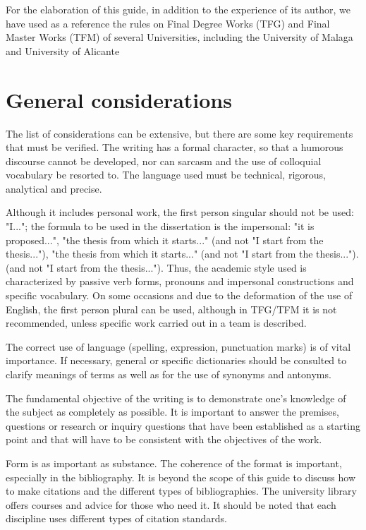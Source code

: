 For the elaboration of this guide, in addition to the experience of its author, we have used as a reference the rules on Final Degree Works (TFG) and Final Master Works (TFM) of several Universities, including the University of Malaga \cite{malaga} and University of Alicante \cite{alicante}


\chapter{General considerations} 
\label{sec:consideraciones}

The list of considerations can be extensive, but there are some key requirements that must be verified.
The writing has a formal character, so that a humorous discourse cannot be developed, nor can sarcasm and the use of colloquial vocabulary be resorted to.  The language used must be technical, rigorous, analytical and precise. 

Although it includes personal work, the first person singular should not be used: "I..."; the formula to be used in the dissertation is the impersonal: "it is proposed...", "the thesis from which it starts..." (and not "I start from the thesis..."), "the thesis from which it starts..." (and not "I start from the thesis...").  (and not "I start from the thesis...").  Thus, the academic style used is characterized by passive verb forms, pronouns and impersonal constructions and specific vocabulary. On some occasions and due to the deformation of the use of English, the first person plural can be used, although in TFG/TFM it is not recommended, unless specific work carried out in a team is described.

The correct use of language (spelling, expression, punctuation marks) is of vital importance.  If necessary, general or specific dictionaries should be consulted to clarify meanings of terms as well as for the use of synonyms and antonyms. 

The fundamental objective of the writing is to demonstrate one's knowledge of the subject as completely as possible. It is important to answer the premises, questions or research or inquiry questions that have been established as a starting point and that will have to be consistent with the objectives of the work.

Form is as important as substance. The coherence of the format is important, especially in the bibliography. It is beyond the scope of this guide to discuss how to make citations and the different types of bibliographies. The university library offers courses and advice for those who need it. It should be noted that each discipline uses different types of citation standards.



